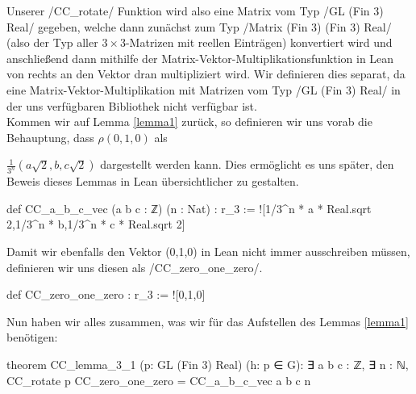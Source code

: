 \documentclass[10pt]{article}
\begin{document}
\noindent Unserer \lean/CC_rotate/ Funktion wird also eine Matrix vom Typ \lean/GL (Fin 3) Real/ gegeben, welche dann zunächst zum Typ \lean/Matrix (Fin 3) (Fin 3) Real/ (also der Typ aller $3\times 3$-Matrizen mit reellen Einträgen) konvertiert wird und anschließend dann mithilfe der Matrix-Vektor-Multiplikationsfunktion in Lean von rechts an den Vektor dran multipliziert wird. Wir definieren dies separat, da eine Matrix-Vektor-Multiplikation mit Matrizen vom Typ \lean/GL (Fin 3) Real/ in der uns verfügbaren Bibliothek nicht verfügbar ist.\\


\noindent Kommen wir auf Lemma \ref{lemma1} zurück, so definieren wir uns vorab die Behauptung, dass $\rho (0,1,0)$ als \par
\noindent $\frac{1}{3^n}(a\sqrt{2},b,c\sqrt{2})$ dargestellt werden kann. Dies ermöglicht es uns später, den Beweis dieses Lemmas in Lean übersichtlicher zu gestalten.
\begin{leancode}
def CC_a_b_c_vec (a b c : ℤ) (n : Nat) : r_3 :=
   ![1/3^n * a * Real.sqrt 2,1/3^n * b,1/3^n * c * Real.sqrt 2]
\end{leancode}

\noindent Damit wir ebenfalls den Vektor (0,1,0) in Lean nicht immer ausschreiben müssen, definieren wir uns diesen als \lean/CC_zero_one_zero/.
\begin{leancode}
def CC_zero_one_zero : r_3 := ![0,1,0]
\end{leancode}

\noindent Nun haben wir alles zusammen, was wir für das Aufstellen des Lemmas \ref{lemma1} benötigen:
\begin{leancode}
theorem CC_lemma_3_1 (p: GL (Fin 3) Real) (h: p ∈ G):
       ∃ a b c : ℤ, ∃ n : ℕ, CC_rotate p CC_zero_one_zero = CC_a_b_c_vec a b c n
\end{leancode}
\end{document}
